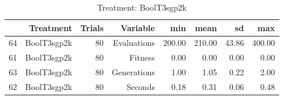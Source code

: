 \begin{table}[ht]
\centering
\begin{tabular}{rrrrrrrr}
  \hline
 & Treatment & Trials & Variable & min & mean & sd & max \\ 
  \hline
64 & BoolT3sgp2k &  80 & Evaluations & 200.00 & 210.00 & 43.86 & 400.00 \\ 
  61 & BoolT3sgp2k &  80 & Fitness & 0.00 & 0.00 & 0.00 & 0.00 \\ 
  63 & BoolT3sgp2k &  80 & Generations & 1.00 & 1.05 & 0.22 & 2.00 \\ 
  62 & BoolT3sgp2k &  80 & Seconds & 0.18 & 0.31 & 0.06 & 0.48 \\ 
   \hline
\end{tabular}
\caption{Treatment: BoolT3sgp2k} 
\end{table}
